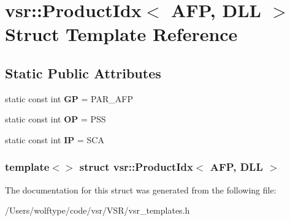 \hypertarget{structvsr_1_1_product_idx_3_01_a_f_p_00_01_d_l_l_01_4}{\section{vsr\-:\-:Product\-Idx$<$ A\-F\-P, D\-L\-L $>$ Struct Template Reference}
\label{structvsr_1_1_product_idx_3_01_a_f_p_00_01_d_l_l_01_4}
}
\subsection*{Static Public Attributes}
\begin{DoxyCompactItemize}
\item 
\hypertarget{structvsr_1_1_product_idx_3_01_a_f_p_00_01_d_l_l_01_4_add1423d3630dcefb50b96401ace2c154}{static const int {\bfseries G\-P} = P\-A\-R\-\_\-\-A\-F\-P}\label{structvsr_1_1_product_idx_3_01_a_f_p_00_01_d_l_l_01_4_add1423d3630dcefb50b96401ace2c154}

\item 
\hypertarget{structvsr_1_1_product_idx_3_01_a_f_p_00_01_d_l_l_01_4_aae29fc710a4694a61fa82557d76e3c73}{static const int {\bfseries O\-P} = P\-S\-S}\label{structvsr_1_1_product_idx_3_01_a_f_p_00_01_d_l_l_01_4_aae29fc710a4694a61fa82557d76e3c73}

\item 
\hypertarget{structvsr_1_1_product_idx_3_01_a_f_p_00_01_d_l_l_01_4_a2a5a3b85e1128aa3a658ef67159c2955}{static const int {\bfseries I\-P} = S\-C\-A}\label{structvsr_1_1_product_idx_3_01_a_f_p_00_01_d_l_l_01_4_a2a5a3b85e1128aa3a658ef67159c2955}

\end{DoxyCompactItemize}
\subsubsection*{template$<$$>$ struct vsr\-::\-Product\-Idx$<$ A\-F\-P, D\-L\-L $>$}



The documentation for this struct was generated from the following file\-:\begin{DoxyCompactItemize}
\item 
/\-Users/wolftype/code/vsr/\-V\-S\-R/vsr\-\_\-templates.\-h\end{DoxyCompactItemize}

